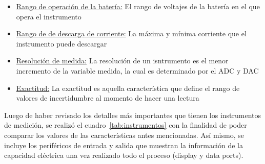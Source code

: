 \begin{itemize}
\item\underline{Rango de operación de la batería:} El rango de voltajes de la batería en el que opera el instrumento
\item\underline{Rango de de descarga de corriente:} La máxima y mínima corriente que el instrumento puede descargar
\item\underline{Resolución de medida:} La resolución de un isntrumento es el menor incremento de la variable medida, la cual es determinado por el ADC y DAC
\item\underline{Exactitud:} La exactitud es aquella característica que define el rango de valores de incertidumbre al momento de hacer una lectura
\end{itemize}

Luego de haber revisado los detalles más importantes que tienen los instrumentos de medición, se realizó el cuadro~\ref{tab:instrumentos} con la finalidad de poder comparar los valores de las características antes mencionadas. Así mismo, se incluye los periféricos de entrada y salida que muestran la información de la capacidad eléctrica una vez realizado todo el proceso (display y data ports).


